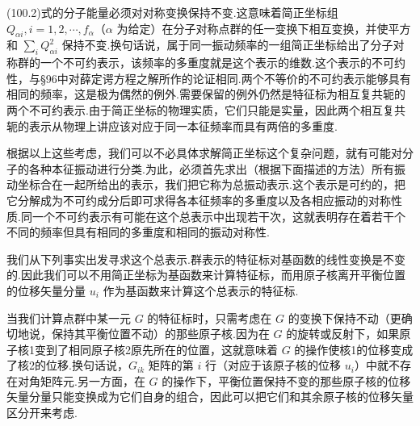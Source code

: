 (100.2)式的分子能量必须对对称变换保持不变.这意味着简正坐标组 $Q_{\alpha i},i=1,2,\cdots,f_\alpha$（$\alpha$ 为给定）在分子对称点群的任一变换下相互变换，并使平方和 $\sum_i Q_{\alpha i}^2$ 保持不变.换句话说，属于同一振动频率的一组简正坐标给出了分子对称群的一个不可约表示，该频率的多重度就是这个表示的维数.这个表示的不可约性，与§96中对薛定谔方程之解所作的论证相同.两个不等价的不可约表示能够具有相同的频率，这是极为偶然的例外.需要保留的例外仍然是特征标为相互复共轭的两个不可约表示.由于简正坐标的物理实质，它们只能是实量，因此两个相互复共轭的表示从物理上讲应该对应于同一本征频率而具有两倍的多重度.

根据以上这些考虑，我们可以不必具体求解简正坐标这个复杂问题，就有可能对分子的各种本征振动进行分类.为此，必须首先求出（根据下面描述的方法）所有振动坐标合在一起所给出的表示，我们把它称为总振动表示.这个表示是可约的，把它分解成为不可约成分后即可求得各本征频率的多重度以及各相应振动的对称性质.同一个不可约表示有可能在这个总表示中出现若干次，这就表明存在着若干个不同的频率但具有相同的多重度和相同的振动对称性.

我们从下列事实出发寻求这个总表示.群表示的特征标对基函数的线性变换是不变的.因此我们可以不用简正坐标为基函数来计算特征标，而用原子核离开平衡位置的位移矢量分量 $u_i$ 作为基函数来计算这个总表示的特征标.

当我们计算点群中某一元 $G$ 的特征标时，只需考虑在 $G$ 的变换下保持不动（更确切地说，保持其平衡位置不动）的那些原子核.因为在 $G$ 的旋转或反射下，如果原子核1变到了相同原子核2原先所在的位置，这就意味着 $G$ 的操作使核1的位移变成了核2的位移.换句话说，$G_{ik}$ 矩阵的第 $i$ 行（对应于该原子核的位移 $u_i$）中就不存在对角矩阵元.另一方面，在 $G$ 的操作下，平衡位置保持不变的那些原子核的位移矢量分量只能变换成为它们自身的组合，因此可以把它们和其余原子核的位移矢量区分开来考虑.

